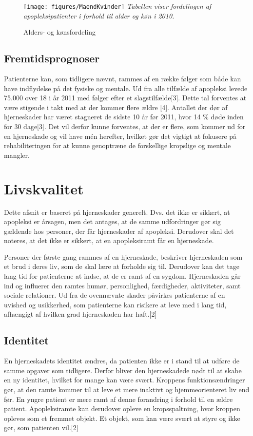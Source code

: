 \begin{figure}[H]
	\caption{Alders- og kønsfordeling}
	\label{AlderKoen}
	\centering
	\texttt{[image: figures/MaendKvinder]}
	\flushleft
	\textit{Tabellen viser fordelingen af apopleksipatienter i forhold til alder og køn i 2010.}
\end{figure}

\subsection{Fremtidsprognoser}
Patienterne kan, som tidligere nævnt, rammes af en række følger som både kan have indflydelse på det fysiske og mentale. Ud fra alle tilfælde af apopleksi levede 75.000 over 18 i år 2011 med følger efter et slagstilfælde[3]. Dette tal forventes at være stigende i takt med at der kommer flere ældre [4]. Antallet der dør af hjerneskader har været stagneret de sidste 10 år før 2011, hvor 14 \% døde inden for 30 dage[3]. Det vil derfor kunne forventes, at der er flere, som kommer ud for en hjerneskade og vil have mén herefter, hvilket gør det vigtigt at fokusere på rehabiliteringen for at kunne genoptræne de forskellige kropslige og mentale mangler.

\section{Livskvalitet}
Dette afsnit er baseret på hjerneskader generelt. Dvs. det ikke er sikkert, at apopleksi er årsagen, men det antages, at de samme udfordringer gør sig gældende hos personer, der får hjerneskader af apopleksi. Derudover skal det noteres, at det ikke er sikkert, at en apopleksiramt får en hjerneskade. 

Personer der første gang rammes af en hjerneskade, beskriver hjerneskaden som et brud i deres liv, som de skal lære at forholde sig til. Derudover kan det tage lang tid for patienterne at indse, at de er ramt af en sygdom. 
Hjerneskaden går ind og influerer den ramtes humør, personlighed, færdigheder, aktiviteter, samt sociale relationer. Ud fra de ovennævnte skader påvirkes patienterne af  en uvished og usikkerhed, som patienterne kan risikere at leve med i lang tid, afhængigt af hvilken grad hjerneskaden har haft.[2] 

\subsection{Identitet}
En hjerneskadets identitet ændres, da patienten ikke er i stand til at udføre de samme opgaver som tidligere. Derfor bliver den hjerneskadede nødt til at skabe en ny identitet, hvilket for mange kan være svært. Kroppens funktionsændringer gør, at den ramte kommer til at leve et mere inaktivt og hjemmeorienteret liv end før. En yngre patient er mere ramt af denne forandring i forhold til en ældre patient. Apopleksiramte kan derudover opleve en kropsspaltning, hvor kroppen opleves som et fremmet objekt. Et objekt, som kan være svært at styre og ikke gør, som patienten vil.[2] 

